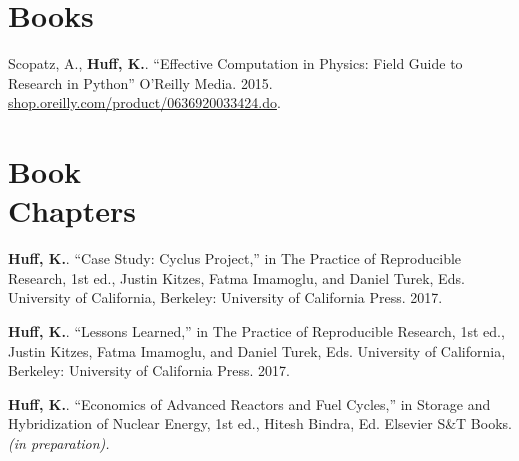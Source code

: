 \documentclass[margin,line]{resume}
\begin{document}
\begin{resume}
    \vspace{-6mm}
    \section{\mysidestyle Books}
      \begin{bibenum}
      \item Scopatz, A., \textbf{Huff, K.}. ``Effective Computation in
      Physics: Field Guide to Research in Python'' O'Reilly Media. 2015.
      \url{shop.oreilly.com/product/0636920033424.do}.
      \end{bibenum}
    \section{\mysidestyle Book\\Chapters}
      \begin{bibenum} 
      \item \textbf{Huff, K.}. ``Case Study: Cyclus Project,'' in The Practice 
              of Reproducible Research, 1st ed., Justin Kitzes, Fatma Imamoglu, 
              and Daniel Turek, Eds. University of California, Berkeley: 
              University of California Press. 2017.
      \item \textbf{Huff, K.}. ``Lessons Learned,'' in The Practice of Reproducible 
              Research, 1st ed., Justin Kitzes, Fatma Imamoglu, and Daniel 
              Turek, Eds. University of California, Berkeley: University of 
              California Press. 2017.
      \item \textbf{Huff, K.}. ``Economics of Advanced Reactors and Fuel 
              Cycles,'' in Storage and Hybridization of Nuclear Energy, 1st 
              ed., Hitesh Bindra, Ed. Elsevier S\&T Books.\textsl{(in 
              preparation).}
      \end{bibenum}

\end{resume}
\end{document}
